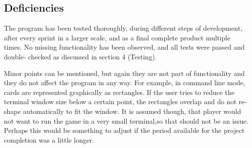 \newpage
\subsection{Deficiencies}

The program has been tested thoroughly, during different steps of development, after every sprint in a larger scale, and as a final complete product multiple times. No missing functionality has been observed, and all tests were passed and double- checked as discussed in section 4 (Testing). 

Minor points can be mentioned, but again they are not part of functionality and they do not affect the program in any way. For example, in command line mode, cards are represented graphically as rectangles. If the user tries to reduce the terminal window size below a certain point, the rectangles overlap and do not re-shape automatically to fit the window. It is assumed though, that player would not want to run the game in a very small terminal,so that should not be an issue. Perhaps this would be something to adjust if the period available for the project completion was a little longer.
